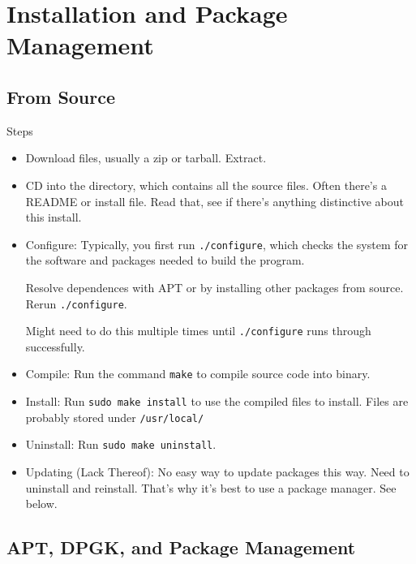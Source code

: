 \documentclass[12pt]{article}
\theoremstyle{plain}
\theoremstyle{definition}
\theoremstyle{remark}
\begin{document}
\clearpage
\section{Installation and Package Management}

\subsection{From Source}

Steps
\begin{itemize}
  \item Download files, usually a zip or tarball. Extract.

  \item CD into the directory, which contains all the source files.
    Often there's a README or install file. Read that, see if there's
    anything distinctive about this install.

  \item Configure:
    Typically, you first run \texttt{./configure}, which checks the
    system for the software and packages needed to build the program.

    Resolve dependences with APT or by installing other packages
    from source. Rerun \texttt{./configure}.

    Might need to do this multiple times until \texttt{./configure} runs
    through successfully.

  \item Compile:
    Run the command \texttt{make} to compile source code into binary.

  \item Install:
    Run \texttt{sudo make install} to use the compiled files to install.
    Files are probably stored under \texttt{/usr/local/}

  \item Uninstall:
    Run \texttt{sudo make uninstall}.

  \item Updating (Lack Thereof):
    No easy way to update packages this way.
    Need to uninstall and reinstall.
    That's why it's best to use a package manager.
    See below.
\end{itemize}


\subsection{APT, DPGK, and Package Management}
\end{document}
